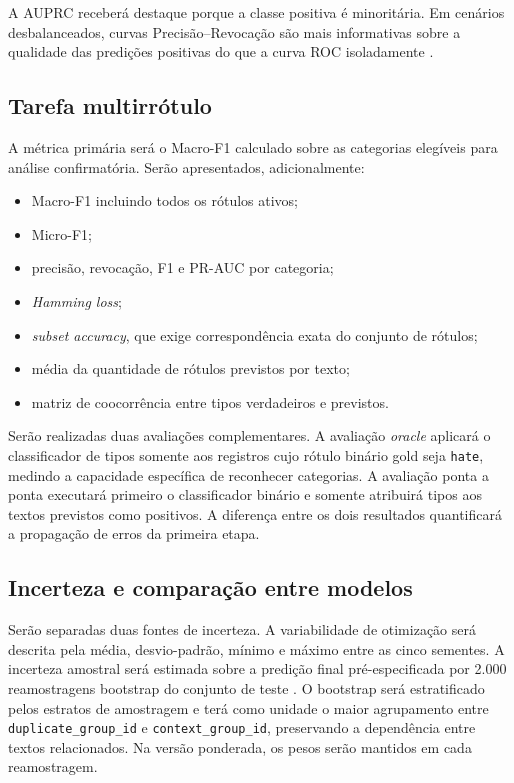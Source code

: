 A AUPRC receberá destaque porque a classe positiva é minoritária. Em cenários
desbalanceados, curvas Precisão--Revocação são mais informativas sobre a
qualidade das predições positivas do que a curva ROC isoladamente
\cite{saito2015precisionrecall}.

\subsection{Tarefa multirrótulo}

A métrica primária será o Macro-F1 calculado sobre as categorias elegíveis para
análise confirmatória. Serão apresentados, adicionalmente:

\begin{itemize}
    \item Macro-F1 incluindo todos os rótulos ativos;
    \item Micro-F1;
    \item precisão, revocação, F1 e PR-AUC por categoria;
    \item \textit{Hamming loss};
    \item \textit{subset accuracy}, que exige correspondência exata do conjunto
    de rótulos;
    \item média da quantidade de rótulos previstos por texto;
    \item matriz de coocorrência entre tipos verdadeiros e previstos.
\end{itemize}

Serão realizadas duas avaliações complementares. A avaliação \textit{oracle}
aplicará o classificador de tipos somente aos registros cujo rótulo binário gold
seja \texttt{hate}, medindo a capacidade específica de reconhecer categorias.
A avaliação ponta a ponta executará primeiro o classificador binário e somente
atribuirá tipos aos textos previstos como positivos. A diferença entre os dois
resultados quantificará a propagação de erros da primeira etapa.

\subsection{Incerteza e comparação entre modelos}

Serão separadas duas fontes de incerteza. A variabilidade de otimização será
descrita pela média, desvio-padrão, mínimo e máximo entre as cinco sementes. A
incerteza amostral será estimada sobre a predição final pré-especificada por
2.000 reamostragens bootstrap do conjunto de teste \cite{efron1993bootstrap}. O
bootstrap será estratificado
pelos estratos de amostragem e terá como unidade o maior agrupamento entre
\texttt{duplicate\_group\_id} e \texttt{context\_group\_id}, preservando a
dependência entre textos relacionados. Na versão ponderada, os pesos serão
mantidos em cada reamostragem.

